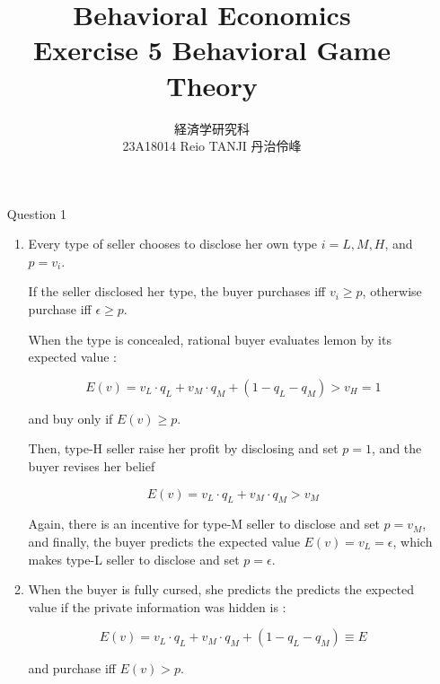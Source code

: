 \documentclass{jsarticle}
\begin{document}
\title{Behavioral Economics \\
Exercise 5 Behavioral Game Theory}
\author{経済学研究科　 \\ 23A18014 Reio TANJI 丹治伶峰}
\date{}
\maketitle

\begin{enumerate}

\item [Question 1]

 \begin{enumerate}
 
 \item
 
 Every type of seller chooses to disclose her own type $i = {L, M, H}$, and $p = v_i$.
 
 If the seller disclosed her type, the buyer purchases iff $v_i \geq p$, otherwise purchase iff $\epsilon \geq p$.
 
 \vspace{0.7zw}
 
 \hspace{2zw}When the type is concealed, rational buyer evaluates lemon by its expected value : 
 
 \[ E(v) = v_L \cdot q_L + v_M \cdot q_M + (1 - q_L - q_M) > v_H = 1 \]
 
 and buy only if $E(v) \geq p$.
 
 Then, type-H seller raise her profit by disclosing and set $p = 1$, and the buyer revises her belief
 
 \[ E(v) = v_L \cdot q_L + v_M \cdot q_M > v_M \]
 
 Again, there is an incentive for type-M seller to disclose and set $p = v_M$, and finally, the buyer predicts the expected value $E(v) = v_L = \epsilon$, which makes type-L seller to disclose and set $p = \epsilon$.
 
 \vspace{1zw}
 
  \item \hspace{2zw} When the buyer  is fully cursed, she predicts the predicts the expected value if the private information was hidden is :
  
  \[E(v) = v_L \cdot q_L + v_M \cdot q_M + (1 - q_L - q_M) \equiv E \]
 
 and purchase iff $E(v) > p$.
 

\end{enumerate}
\end{enumerate}
\end{document}

